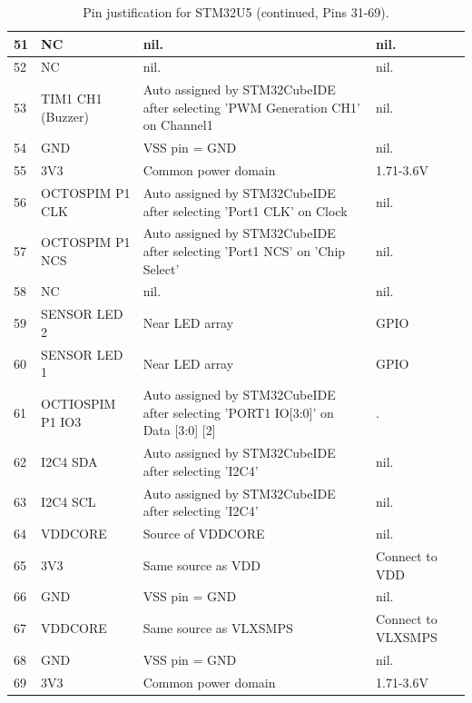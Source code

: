 \begin{table}[H]
\begin{tabular}{|l|p{3cm}|p{6.5cm}|p{3.5cm}|}
        51 & NC & nil. & nil. \\ \hline
        52 & NC & nil. & nil. \\ \hline
        53 & TIM1 CH1 (Buzzer) & Auto assigned by STM32CubeIDE after selecting 'PWM Generation CH1' on Channel1 & nil. \\ \hline
        54 & GND & VSS pin = GND & nil. \\ \hline
        55 & 3V3 & Common power domain & 1.71-3.6V \\ \hline
        56 & OCTOSPIM P1 CLK & Auto assigned by STM32CubeIDE after selecting 'Port1 CLK' on Clock & nil. \\ \hline
        57 & OCTOSPIM P1 NCS & Auto assigned by STM32CubeIDE after selecting 'Port1 NCS' on 'Chip Select' & nil. \\ \hline
        58 & NC & nil. & nil. \\ \hline
        59 & SENSOR LED 2 & Near LED array & GPIO \\ \hline
        60 & SENSOR LED 1 & Near LED array & GPIO \\ \hline
        61 & OCTIOSPIM P1 IO3 & Auto assigned by STM32CubeIDE after selecting 'PORT1 IO[3:0]' on Data [3:0] \hypertarget{octo-io-4+}{[2]} & . \\ \hline
        62 & I2C4 SDA & Auto assigned by STM32CubeIDE after selecting 'I2C4' & nil. \\ \hline
        63 & I2C4 SCL & Auto assigned by STM32CubeIDE after selecting 'I2C4' & nil. \\ \hline
        64 & VDDCORE & Source of VDDCORE & nil. \\ \hline
        65 & 3V3 & Same source as VDD & Connect to VDD \\ \hline
        66 & GND & VSS pin = GND & nil. \\ \hline
        67 & VDDCORE & Same source as VLXSMPS & Connect to VLXSMPS \\ \hline
        68 & GND & VSS pin = GND & nil. \\ \hline
        69 & 3V3 & Common power domain & 1.71-3.6V \\ \hline
    \end{tabular}
    \caption{Pin justification for STM32U5 (continued, Pins 31-69).}
\end{table}

